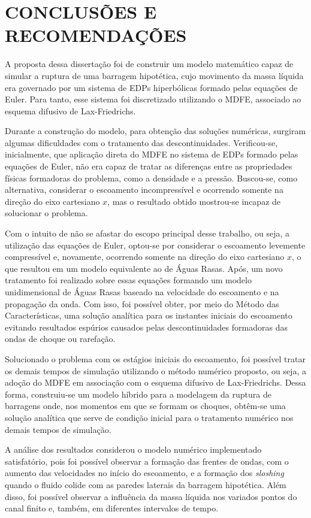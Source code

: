 \chapter{CONCLUSÕES E RECOMENDAÇÕES}

A proposta dessa dissertação foi de construir um modelo matemático capaz de simular a ruptura de uma barragem hipotética, cujo movimento da massa líquida era governado por um sistema de EDPs hiperbólicas formado pelas equações de Euler. Para tanto, esse sistema foi discretizado utilizando o MDFE, associado ao esquema difusivo de Lax-Friedrichs. 

Durante a construção do modelo, para obtenção das soluções numéricas, surgiram algumas dificuldades com o tratamento das descontinuidades. Verificou-se, inicialmente, que aplicação direta do MDFE no sistema de EDPs formado pelas equações de Euler, não era capaz de tratar as diferenças entre as propriedades físicas formadoras do problema, como a densidade e a pressão. Buscou-se, como alternativa, considerar o escoamento incompressível e ocorrendo somente na direção do eixo cartesiano $x$, mas o resultado obtido mostrou-se incapaz de solucionar o problema.

Com o intuito de não se afastar do escopo principal desse trabalho, ou seja, a utilização das equações de Euler, optou-se por considerar o escoamento levemente compressível e, novamente, ocorrendo somente na direção do eixo cartesiano $x$, o que resultou em um modelo equivalente ao de Águas Rasas. Após, um novo tratamento foi realizado sobre essas equações formando um modelo unidimensional de Águas Rasas baseado na velocidade do escoamento e na propagação da onda. Com isso, foi possível obter, por meio do Método das Características, uma solução analítica para os instantes iniciais do escoamento evitando resultados espúrios causados pelas descontinuidades formadoras das ondas de choque ou rarefação. 

Solucionado o problema com os estágios iniciais do escoamento, foi possível tratar os demais tempos de simulação utilizando o método numérico proposto, ou seja, a adoção do MDFE em associação com o esquema difusivo de Lax-Friedrichs. Dessa forma, construiu-se um modelo híbrido para a modelagem da ruptura de barragens onde, nos momentos em que se formam os choques, obtêm-se uma solução analítica que serve de condição inicial para o tratamento numérico nos demais tempos de simulação. 

A análise dos resultados considerou o modelo numérico implementado satisfatório, pois foi possível observar a formação das frentes de ondas, com o aumento das velocidades no início do escoamento, e a formação dos \textit{sloshing} quando o fluido colide com as paredes laterais da barragem hipotética. Além disso, foi possível observar a influência da massa líquida nos variados pontos do canal finito e, também, em diferentes intervalos de tempo. 

